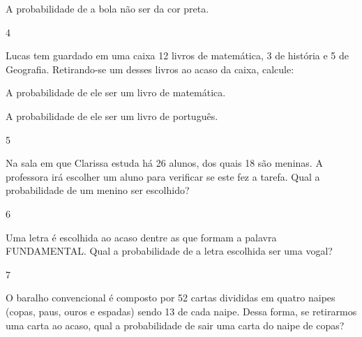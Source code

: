 \begin{escolha}
\begin{escolha}
\item
  A probabilidade de a bola não ser da cor preta.
\end{escolha}


\num{4}

Lucas tem guardado em uma caixa 12 livros de matemática, 3 de história e
5 de Geografia. Retirando-se um desses livros ao acaso da caixa,
calcule:

\begin{escolha}

\item
  A probabilidade de ele ser um livro de matemática.

\item
  A probabilidade de ele ser um livro de português.

\end{escolha}

\num{5}

Na sala em que Clarissa estuda há 26 alunos, dos quais 18 são meninas. A
professora irá escolher um aluno para verificar se este fez a tarefa.
Qual a probabilidade de um menino ser escolhido?


\num{6}

Uma letra é escolhida ao acaso dentre as que formam a palavra
FUNDAMENTAL. Qual a probabilidade de a letra escolhida ser uma vogal?


\num{7}

O baralho convencional é composto por 52 cartas divididas em quatro
naipes (copas, paus, ouros e espadas) sendo 13 de cada naipe. Dessa
forma, se retirarmos uma carta ao acaso, qual a probabilidade de sair
uma carta do naipe de copas?



\end{escolha}
